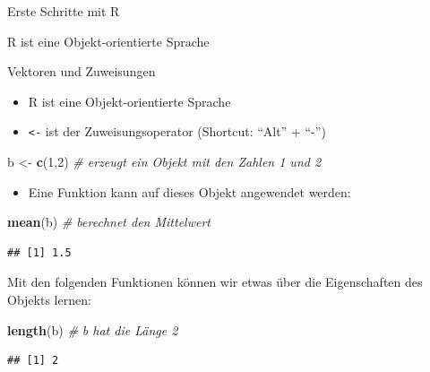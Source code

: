 \documentclass[ignorenonframetext,]{beamer}
\newenvironment{Shaded}{}{}
\newcommand{\KeywordTok}[1]{\textcolor[rgb]{0.00,0.44,0.13}{\textbf{{#1}}}}
\newcommand{\DecValTok}[1]{\textcolor[rgb]{0.25,0.63,0.44}{{#1}}}
\newcommand{\StringTok}[1]{\textcolor[rgb]{0.25,0.44,0.63}{{#1}}}
\newcommand{\CommentTok}[1]{\textcolor[rgb]{0.38,0.63,0.69}{\textit{{#1}}}}
\newcommand{\NormalTok}[1]{{#1}}
\providecommand{\tightlist}{%
\setlength{\itemsep}{0pt}\setlength{\parskip}{0pt}}
\begin{document}
\begin{frame}{Erste Schritte mit R}

\end{frame}

\begin{frame}[fragile]{R ist eine Objekt-orientierte Sprache}

Vektoren und Zuweisungen

\begin{itemize}
\tightlist
\item
  R ist eine Objekt-orientierte Sprache
\item
  \texttt{\textless{}-} ist der Zuweisungsoperator (Shortcut: ``Alt'' +
  ``-'')
\end{itemize}

\begin{Shaded}
\begin{Highlighting}[]
\NormalTok{b <-}\StringTok{ }\KeywordTok{c}\NormalTok{(}\DecValTok{1}\NormalTok{,}\DecValTok{2}\NormalTok{) }\CommentTok{# erzeugt ein Objekt mit den Zahlen 1 und 2}
\end{Highlighting}
\end{Shaded}

\begin{itemize}
\tightlist
\item
  Eine Funktion kann auf dieses Objekt angewendet werden:
\end{itemize}

\begin{Shaded}
\begin{Highlighting}[]
\KeywordTok{mean}\NormalTok{(b) }\CommentTok{# berechnet den Mittelwert}
\end{Highlighting}
\end{Shaded}

\begin{verbatim}
## [1] 1.5
\end{verbatim}

Mit den folgenden Funktionen können wir etwas über die Eigenschaften des
Objekts lernen:

\begin{Shaded}
\begin{Highlighting}[]
\KeywordTok{length}\NormalTok{(b) }\CommentTok{# b hat die Länge 2}
\end{Highlighting}
\end{Shaded}

\begin{verbatim}
## [1] 2
\end{verbatim}

\end{frame}
\end{document}
